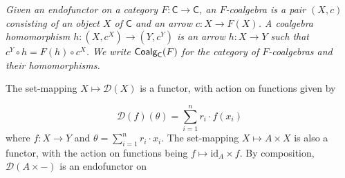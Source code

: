 \documentclass[11pt,a4paper]{amsart}
\begin{document}
\hypertarget{html:S2.Thmtheorem4.p1}{} \emph{Given an endofunctor on a category %
\hypertarget{html:S2.Thmtheorem4.p1.m1}{}\({F\colon\mathsf{C}\to\mathsf{C}}\), an \emph{%
\hypertarget{html:S2.Thmtheorem4.p1.m2}{}\({F}\)-coalgebra} is a pair %
\hypertarget{html:S2.Thmtheorem4.p1.m3}{}\({(X,c)}\) consisting of an object %
\hypertarget{html:S2.Thmtheorem4.p1.m4}{}\({X}\) of %
\hypertarget{html:S2.Thmtheorem4.p1.m5}{}\({\mathsf{C}}\) and an arrow %
\hypertarget{html:S2.Thmtheorem4.p1.m6}{}\({c\colon X\to F(X)}\). A \emph{coalgebra homomorphism} %
\hypertarget{html:S2.Thmtheorem4.p1.m7}{}\({h\colon(X,c^{X})\to(Y,c^{Y})}\) is an arrow %
\hypertarget{html:S2.Thmtheorem4.p1.m8}{}\({h\colon X\to Y}\) such that %
\hypertarget{html:S2.Thmtheorem4.p1.m9}{}\({c^{Y}\circ h=F(h)\circ c^{X}}\). We write %
\hypertarget{html:S2.Thmtheorem4.p1.m10}{}\({\mbox{\sf Coalg}_{\mathsf{C}}(F)}\) for the category of %
\hypertarget{html:S2.Thmtheorem4.p1.m11}{}\({F}\)-coalgebras and their homomorphisms.}
\par\medskip
\hypertarget{html:S2.SS0.SSS0.P0.SPx3.p2}{} The set-mapping %
\hypertarget{html:S2.SS0.SSS0.P0.SPx3.p2.m1}{}\({X\mapsto{\mathcal{D}}(X)}\) is a functor, with action on functions given by
\par\medskip
\hypertarget{html:S2.Ex3}{}   %
\hypertarget{html:S2.Ex3.m1}{}\[{\mathcal{D}}(f)(\theta)=\sum_{i=1}^{n}r_{i}\cdot f(x_{i})\]    where %
\hypertarget{html:S2.SS0.SSS0.P0.SPx3.p2.m2}{}\({f\colon X\to Y}\) and %
\hypertarget{html:S2.SS0.SSS0.P0.SPx3.p2.m3}{}\({\theta=\sum_{i=1}^{n}r_{i}\cdot x_{i}}\). The set-mapping %
\hypertarget{html:S2.SS0.SSS0.P0.SPx3.p2.m4}{}\({X\mapsto A\times X}\) is also a functor, with the action on functions being %
\hypertarget{html:S2.SS0.SSS0.P0.SPx3.p2.m5}{}\({f\mapsto\mathrm{id}_{A}\times f}\). By composition, %
\hypertarget{html:S2.SS0.SSS0.P0.SPx3.p2.m6}{}\({{\mathcal{D}}(A\times-)}\) is an endofunctor on %
\end{document}
